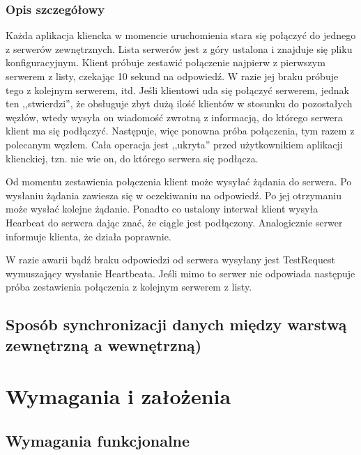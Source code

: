 \subsubsection*[Opis szczegółowy]{Opis szczegółowy}
\par{Każda aplikacja kliencka w momencie uruchomienia stara się połączyć do jednego z serwerów zewnętrznych. Lista serwerów jest z góry ustalona i znajduje się pliku konfiguracyjnym. Klient próbuje zestawić połączenie najpierw z pierwszym serwerem z listy, czekając 10 sekund na odpowiedź. W razie jej braku próbuje tego z kolejnym serwerem, itd. Jeśli klientowi uda się połączyć serwerem, jednak ten ,,stwierdzi'', że obsługuje zbyt dużą ilość klientów w stosunku do pozostałych węzłów, wtedy wysyła on wiadomość zwrotną z informacją, do którego serwera klient ma się podłączyć. Następuje, więc ponowna próba połączenia, tym razem z polecanym węzłem. Cała operacja jest ,,ukryta'' przed użytkownikiem aplikacji klienckiej, tzn. nie wie on, do którego serwera się podłącza.}

\par{Od momentu zestawienia połączenia klient może wysyłać żądania do serwera. Po wysłaniu żądania zawiesza się w oczekiwaniu na odpowiedź. Po jej otrzymaniu może wysłać kolejne żądanie. Ponadto co ustalony interwał klient wysyła Hearbeat do serwera dając znać, że ciągle jest podłączony. Analogicznie serwer informuje klienta, że działa poprawnie.}

\par{W razie awarii bądź braku odpowiedzi od serwera wysyłany jest TestRequest wymuszający wysłanie Heartbeata. Jeśli mimo to serwer nie odpowiada następuje próba zestawienia połączenia z kolejnym serwerem z listy.}


\subsection[Sposób synchronizacji danych między warstwą zewnętrzną a wewnętrzną]{Sposób synchronizacji danych między warstwą zewnętrzną a wewnętrzną)}

\section[Wymagania i założenia]{Wymagania i założenia}

\subsection[Wymagania funkcjonalne]{Wymagania funkcjonalne}

